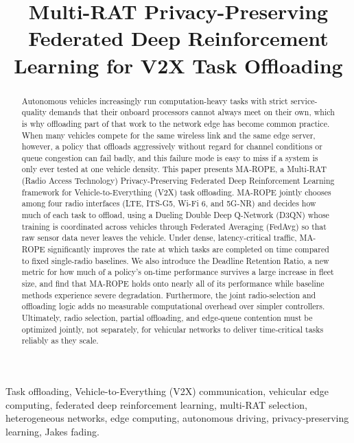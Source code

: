 \documentclass[journal,10pt,twocolumn]{IEEEtran}
\begin{document}
\title{Multi-RAT Privacy-Preserving Federated Deep Reinforcement Learning for V2X Task Offloading}

\maketitle

\begin{abstract}
Autonomous vehicles increasingly run computation-heavy tasks with strict service-quality demands that their onboard processors cannot always meet on their own, which is why offloading part of that work to the network edge has become common practice. When many vehicles compete for the same wireless link and the same edge server, however, a policy that offloads aggressively without regard for channel conditions or queue congestion can fail badly, and this failure mode is easy to miss if a system is only ever tested at one vehicle density. This paper presents MA-ROPE, a Multi-RAT (Radio Access Technology) Privacy-Preserving Federated Deep Reinforcement Learning framework for Vehicle-to-Everything (V2X) task offloading. MA-ROPE jointly chooses among four radio interfaces (LTE, ITS-G5, Wi-Fi 6, and 5G-NR) and decides how much of each task to offload, using a Dueling Double Deep Q-Network (D3QN) whose training is coordinated across vehicles through Federated Averaging (FedAvg) so that raw sensor data never leaves the vehicle. Under dense, latency-critical traffic, MA-ROPE significantly improves the rate at which tasks are completed on time compared to fixed single-radio baselines. We also introduce the Deadline Retention Ratio, a new metric for how much of a policy's on-time performance survives a large increase in fleet size, and find that MA-ROPE holds onto nearly all of its performance while baseline methods experience severe degradation. Furthermore, the joint radio-selection and offloading logic adds no measurable computational overhead over simpler controllers. Ultimately, radio selection, partial offloading, and edge-queue contention must be optimized jointly, not separately, for vehicular networks to deliver time-critical tasks reliably as they scale.
\end{abstract}
\begin{IEEEkeywords}
Task offloading, Vehicle-to-Everything (V2X) communication, vehicular edge computing, federated deep reinforcement learning, multi-RAT selection, heterogeneous networks, edge computing, autonomous driving, privacy-preserving learning, Jakes fading.
\end{IEEEkeywords}
\end{document}
